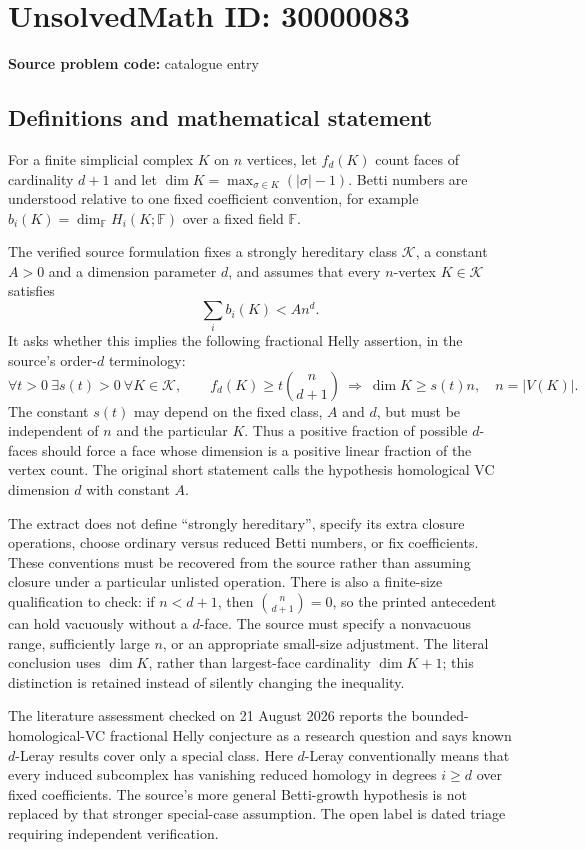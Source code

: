 \documentclass[11pt]{article}
\begin{document}
\section*{UnsolvedMath ID: 30000083}
\textbf{Source problem code:} catalogue entry
\subsection{Definitions and mathematical statement}
For a finite simplicial complex $K$ on $n$ vertices, let $f_d(K)$ count faces of cardinality $d+1$ and let $\dim K=\max_{\sigma\in K}(|\sigma|-1)$. Betti numbers are understood relative to one fixed coefficient convention, for example $b_i(K)=\dim_{\mathbb F}H_i(K;\mathbb F)$ over a fixed field $\mathbb F$.

The verified source formulation fixes a strongly hereditary class $\mathcal K$, a constant $A>0$ and a dimension parameter $d$, and assumes that every $n$-vertex $K\in\mathcal K$ satisfies
\[
 \sum_i b_i(K)<An^d.
\]
It asks whether this implies the following fractional Helly assertion, in the source's order-$d$ terminology:
\[
 \forall t>0\ \exists s(t)>0\ \forall K\in\mathcal K,
 \qquad f_d(K)\ge t\binom n{d+1}
 \ \Longrightarrow\ \dim K\ge s(t)n,
 \quad n=|V(K)|.
\]
The constant $s(t)$ may depend on the fixed class, $A$ and $d$, but must be independent of $n$ and the particular $K$. Thus a positive fraction of possible $d$-faces should force a face whose dimension is a positive linear fraction of the vertex count. The original short statement calls the hypothesis homological VC dimension $d$ with constant $A$.

The extract does not define ``strongly hereditary'', specify its extra closure operations, choose ordinary versus reduced Betti numbers, or fix coefficients. These conventions must be recovered from the source rather than assuming closure under a particular unlisted operation. There is also a finite-size qualification to check: if $n<d+1$, then $\binom n{d+1}=0$, so the printed antecedent can hold vacuously without a $d$-face. The source must specify a nonvacuous range, sufficiently large $n$, or an appropriate small-size adjustment. The literal conclusion uses $\dim K$, rather than largest-face cardinality $\dim K+1$; this distinction is retained instead of silently changing the inequality.

The literature assessment checked on 21 August 2026 reports the bounded-homological-VC fractional Helly conjecture as a research question and says known $d$-Leray results cover only a special class. Here $d$-Leray conventionally means that every induced subcomplex has vanishing reduced homology in degrees $i\ge d$ over fixed coefficients. The source's more general Betti-growth hypothesis is not replaced by that stronger special-case assumption. The open label is dated triage requiring independent verification.
\end{document}
